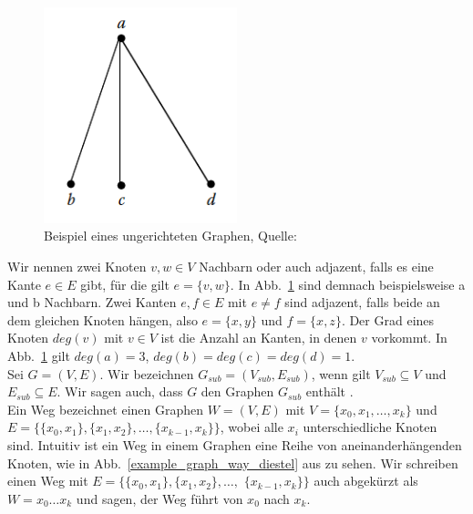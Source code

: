 \documentclass[12pt, a4paper]{article}
\begin{document}
\begin{figure}[h!]
\centering
\includegraphics[width=0.5\textwidth]{example_graph_BrandstaedtEtAl.png}
\caption[Beispiel eines ungerichteten Graphen]{Beispiel eines ungerichteten Graphen, Quelle: \protect{}}
\label{example_graph_brandstaedtetal}
\end{figure}

Wir nennen zwei Knoten $v, w \in V$ Nachbarn oder auch adjazent, falls es eine Kante $e \in E$ gibt, für die gilt $e=\{v, w\}$. In Abb.~\ref{example_graph_brandstaedtetal} sind demnach beispielsweise a und b Nachbarn. Zwei Kanten $e, f \in E$ mit $e \neq f$ sind adjazent, falls beide an dem gleichen Knoten hängen, also $e = \{x, y\}$ und $f=\{x, z\}$. Der Grad eines Knoten $deg(v)$ mit $v \in V$ ist die Anzahl an Kanten, in denen $v$ vorkommt. In Abb.~\ref{example_graph_brandstaedtetal} gilt $deg(a)=3$, $deg(b) = deg(c) = deg(d) = 1$.\\

Sei $G = (V, E)$. Wir bezeichnen $G_{sub} = (V_{sub}, E_{sub})$, wenn gilt $V_{sub} \subseteq V$ und $E_{sub} \subseteq E$. Wir sagen auch, dass $G$ den Graphen $G_{sub}$ enthält \cite[S.~5]{arumugam2016handbook}.\\

Ein Weg bezeichnet einen Graphen $W = (V, E)$ mit $V = \{x_0, x_1, \dots, x_k\}$ und $E = \{\{x_0, x_1\}, \{x_1, x_2\}, \dots, \{x_{k-1}, x_k\}\}$, wobei alle $x_i$ unterschiedliche Knoten sind. Intuitiv ist ein Weg in einem Graphen eine Reihe von aneinanderhängenden Knoten, wie in Abb.~\ref{example_graph_way_diestel} aus  zu sehen. Wir schreiben einen Weg mit $E = \{\{x_0, x_1\}, \{x_1, x_2\}, \dots,$ $\{x_{k-1}, x_k\}\}$ auch abgekürzt als $W = x_0\dots x_k$ und sagen, der Weg führt von $x_0$ nach $x_k$.\\
\end{document}
